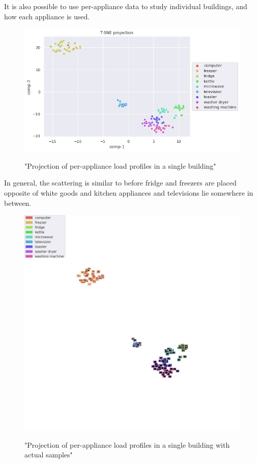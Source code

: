 It is also possible to use per-appliance data to study
individual buildings, and how each appliance is used.

\begin{figure}[H]
	\centering
	\caption{"Projection of per-appliance load profiles in a single building"}
	\includegraphics[width=.8\textwidth]{Figures/TSNE/TSNE_results/refit/scatter_refit_8.png}
	\label{fig:tsne_papb_scatter_ent_refit8}
\end{figure}

In general, the scattering is similar to before
fridge and freezers are placed opposite of white goods and kitchen appliances and 
televisions lie somewhere in between. 

\begin{figure}[H]
	\centering
	\caption{"Projection of per-appliance load profiles in a single building with actual samples"}
	\includegraphics[width=.9\textwidth]{Figures/TSNE/TSNE_results/refit/img_scatter_refit8.png}
	\label{fig:tsne_papb_img_scatter_ent_refit8}
\end{figure}

